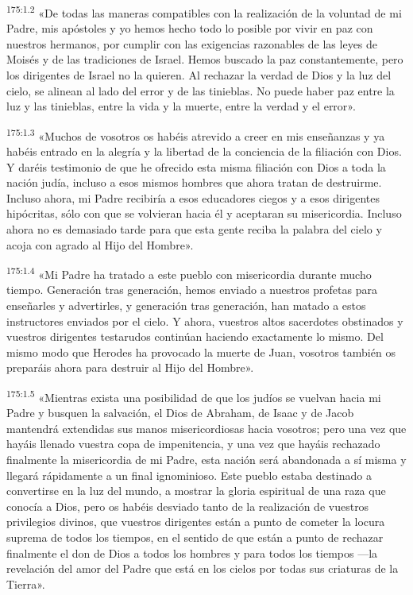 \par
\textsuperscript{175:1.2} «De todas las maneras compatibles con la realización de la voluntad de mi Padre, mis apóstoles y yo hemos hecho todo lo posible por vivir en paz con nuestros hermanos, por cumplir con las exigencias razonables de las leyes de Moisés y de las tradiciones de Israel. Hemos buscado la paz constantemente, pero los dirigentes de Israel no la quieren. Al rechazar la verdad de Dios y la luz del cielo, se alinean al lado del error y de las tinieblas. No puede haber paz entre la luz y las tinieblas, entre la vida y la muerte, entre la verdad y el error».

\par
\textsuperscript{175:1.3} «Muchos de vosotros os habéis atrevido a creer en mis enseñanzas y ya habéis entrado en la alegría y la libertad de la conciencia de la filiación con Dios. Y daréis testimonio de que he ofrecido esta misma filiación con Dios a toda la nación judía, incluso a esos mismos hombres que ahora tratan de destruirme. Incluso ahora, mi Padre recibiría a esos educadores ciegos y a esos dirigentes hipócritas, sólo con que se volvieran hacia él y aceptaran su misericordia. Incluso ahora no es demasiado tarde para que esta gente reciba la palabra del cielo y acoja con agrado al Hijo del Hombre».

\par
\textsuperscript{175:1.4} «Mi Padre ha tratado a este pueblo con misericordia durante mucho tiempo. Generación tras generación, hemos enviado a nuestros profetas para enseñarles y advertirles, y generación tras generación, han matado a estos instructores enviados por el cielo. Y ahora, vuestros altos sacerdotes obstinados y vuestros dirigentes testarudos continúan haciendo exactamente lo mismo. Del mismo modo que Herodes ha provocado la muerte de Juan, vosotros también os preparáis ahora para destruir al Hijo del Hombre».

\par
\textsuperscript{175:1.5} «Mientras exista una posibilidad de que los judíos se vuelvan hacia mi Padre y busquen la salvación, el Dios de Abraham, de Isaac y de Jacob mantendrá extendidas sus manos misericordiosas hacia vosotros; pero una vez que hayáis llenado vuestra copa de impenitencia, y una vez que hayáis rechazado finalmente la misericordia de mi Padre, esta nación será abandonada a sí misma y llegará rápidamente a un final ignominioso. Este pueblo estaba destinado a convertirse en la luz del mundo, a mostrar la gloria espiritual de una raza que conocía a Dios, pero os habéis desviado tanto de la realización de vuestros privilegios divinos, que vuestros dirigentes están a punto de cometer la locura suprema de todos los tiempos, en el sentido de que están a punto de rechazar finalmente el don de Dios a todos los hombres y para todos los tiempos ---la revelación del amor del Padre que está en los cielos por todas sus criaturas de la Tierra».

